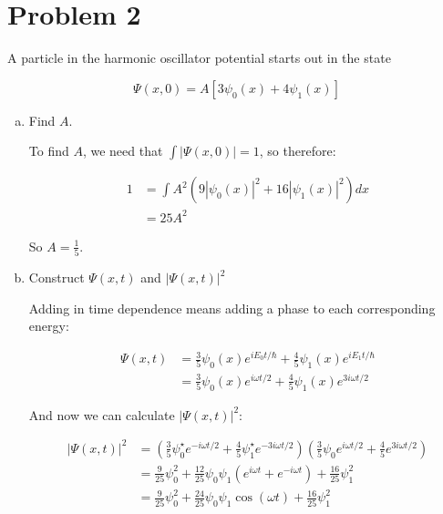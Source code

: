 \documentclass[10pt]{article}
\begin{document}
    \pagebreak
    \section*{Problem 2}
    A particle in the harmonic oscillator potential starts out in the state

    \[ \Psi(x, 0) = A[3\psi_0(x) + 4 \psi_1(x)]\]

    \begin{enumerate}[(a)]
        \item Find $A$. 
        
        \begin{solution}
            To find $A$, we need that $\int |\Psi(x, 0)| = 1$, so therefore: 

            \begin{align*}
                1 &= \int A^2 (9 |\psi_0(x)|^2 + 16 |\psi_1(x)|^2) dx\\
                &= 25A^2
            \end{align*}

            So $A = \frac 15$. 
        \end{solution}
        \item Construct $\Psi(x, t)$ and $|\Psi(x, t)|^2$
        
        \begin{solution}
            Adding in time dependence means adding a phase to each corresponding energy: 

            \begin{align*}
                \Psi(x, t) &= \frac 35 \psi_0(x) e^{iE_0t/\hbar} + \frac 45 \psi_1(x) e^{iE_1t/\hbar}\\
                &= \frac 35 \psi_0(x) e^{i\omega t/2} + \frac 45 \psi_1(x) e^{3i\omega t/2}
            \end{align*}

            And now we can calculate $|\Psi(x, t)|^2$: 

            \begin{align*}
                |\Psi(x, t)|^2 &= \left(\frac 35 \psi_0^\star e^{-i\omega t/2} + \frac 45 \psi_1^\star e^{-3i\omega t/2}\right) \left(\frac 35 \psi_0 e^{i\omega t/2} + \frac 45 e^{3i\omega t/2}\right)\\
                &= \frac{9}{25} \psi_0^2 + \frac{12}{25} \psi_0 \psi_1 (e^{i\omega t} + e^{-i\omega t})+ \frac{16}{25}\psi_1^2\\
                &= \frac{9}{25} \psi_0^2 + \frac{24}{25} \psi_0 \psi_1 \cos(\omega t)+ \frac{16}{25}\psi_1^2
            \end{align*}


\end{solution}
\end{enumerate}
\end{document}
